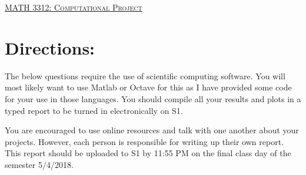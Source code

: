 \documentclass[11pt, a4paper]{article}
\renewcommand*{\arraystretch}{.5}
\begin{document}
\begin{center}
{\Large \underline{\textsc{MATH 3312:  Computational Project}}}
\end{center}


\section*{Directions:}
The below questions require the use of scientific computing software. You will most likely want to use Matlab or Octave for this as I have provided some code for your use in those languages. You should compile all your results and plots in a typed report to be turned in electronically on S1. 

 You are encouraged to use online resources and talk with one another about your projects. However, each person is responsible for writing up their own report. This report should be uploaded to S1 by 11:55 PM on the final class day of the semester 5/4/2018.  
\end{document}
